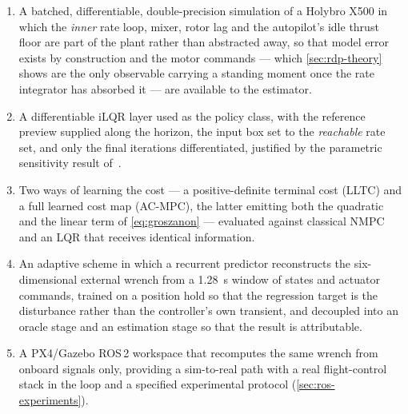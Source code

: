 \documentclass[11pt,a4paper,twoside,openright]{report}
\DeclareRobustCommand{\ACMPC}{AC\nbd MPC}
\DeclareRobustCommand{\LLTC}{LLTC}
\theoremstyle{plain}
\theoremstyle{definition}
\theoremstyle{remark}
\DeclareRobustCommand{\nbd}{\mbox{-}}
\begin{document}
	\begin{enumerate}[leftmargin=*]
		\item A batched, differentiable, double-precision simulation of a Holybro X500
		in which the \emph{inner} rate loop, mixer, rotor lag and the autopilot's idle
		thrust floor are part of the plant rather than abstracted away, so that model
		error exists by construction and the motor commands --- which
		\cref{sec:rdp-theory} shows are the only observable carrying a standing moment
		once the rate integrator has absorbed it --- are available to the estimator.
		\item A differentiable iLQR layer used as the policy class, with the
		reference preview supplied along the horizon, the input box set to the
		\emph{reachable} rate set, and only the final iterations differentiated,
		justified by the parametric sensitivity result of~\cite{buskens2001sensitivity}.
		\item Two ways of learning the cost --- a positive-definite terminal cost
		(\LLTC) and a full learned cost map (\ACMPC), the latter emitting both the
		quadratic and the linear term of \cref{eq:groszanon} --- evaluated against
		classical NMPC and an LQR that receives identical information.
		\item An adaptive scheme in which a recurrent predictor reconstructs the
		six-dimensional external wrench from a \SI{1.28}{\second} window of states and
		actuator commands, trained on a position hold so that the regression target is
		the disturbance rather than the controller's own transient, and decoupled into
		an oracle stage and an estimation stage so that the result is attributable.
		\item A PX4/Gazebo ROS\,2 workspace that recomputes the same wrench from onboard
		signals only, providing a sim-to-real path with a real flight-control stack in
		the loop and a specified experimental protocol
		(\cref{sec:ros-experiments}).
	\end{enumerate}
\end{document}
